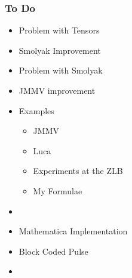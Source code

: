 \documentclass[handout]{beamer}
\begin{document}

\begin{frame}
  \frametitle{To Do}
  \begin{itemize}
  \item Problem with Tensors
  \item Smolyak Improvement
  \item Problem with Smolyak
  \item JMMV improvement
  \item Examples
    \begin{itemize}
    \item JMMV
    \item Luca
    \item Experiments at the ZLB
    \item My Formulae
    \end{itemize}
  \item 
  \item Mathematica Implementation
  \item Block Coded Pulse
  \item 
  \end{itemize}
\end{frame}
\end{document}
